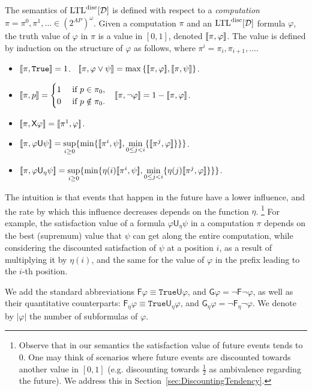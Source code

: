 \documentclass{llncs}
\newcommand{\set}[1]{{\left\{#1\right\}}}
\newcommand{\True}{\mathtt{True}}
\newcommand{\LTL}{{\ensuremath{\rm LTL}}\xspace}
\newcommand{\Next}{\mathsf{X}}
\newcommand{\Ev}{\mathsf{F}}
\newcommand{\Alw}{\mathsf{G}}
\newcommand{\Until}{\mathsf{U}}
\newcommand{\D}{{\cal D}}
\renewcommand{\phi}{\varphi}
\newcommand{\maxs}[1]{\max\set{#1}}
\newcommand{\DLTL}{\ensuremath{\LTL^{\text{disc}}[\D]}}
\newcommand{\df}{\eta}
\begin{document}
The semantics of $\DLTL$ is defined with respect to a {\em computation\/} $\pi=\pi^0,\pi^1,\ldots \in (2^{AP})^\omega$. Given a computation $\pi$ and an $\DLTL$ formula $\varphi$, the truth value of $\varphi$ in $\pi$ is a value in $[0,1]$, denoted $\sem{\pi,\phi}$. The value is defined by induction on the structure of $\varphi$ as follows, where $\pi^i=\pi_i,\pi_{i+1},\ldots$.
\begin{itemize}
\item $\sem{\pi,\True}=1$. \hspace{2.98cm}  ~$\sem{\pi, \phi\vee \psi}=\maxs{\sem{\pi, \phi},\sem{\pi,\psi}}$.
\item $[\![\pi,p]\!]=
\begin{cases}
1 & \mbox{ if }p\in \pi_0,\\
0 & \mbox{ if } p\notin \pi_0.
\end{cases}$  \hspace{1.5cm}  ~$\sem{\pi,\neg \phi}=1-\sem{\pi, \phi}$.
\item $\sem{\pi,\Next \phi}=\sem{\pi^1,\phi}$.
\item $\sem{\pi, \varphi \Until \psi}  = \sup\limits_{i\ge 0} \{ \min \{\sem{\pi^i,\psi},  \min\limits_{0\leq j < i}\{ \sem{\pi^j,\varphi}\}\}\}$.
\item $\sem{\pi, \varphi \Until_{\df} \psi}  = \sup\limits_{i\ge 0} \{ \min \{\df(i)\sem{\pi^i,\psi},  \min\limits_{0\leq j < i}\{\df(j) \sem{\pi^j,\varphi}\}\}\}$.


\end{itemize}

The intuition is that events that happen in the future have a lower influence,
 and the rate by which this influence decreases depends on the function $\df$.
\footnote{Observe that in our semantics the satisfaction value of future events tends to $0$. One may think of scenarios where future events are discounted towards another value in $[0,1]$ (e.g. discounting towards $\frac12$ as ambivalence regarding the future). We address this in Section~\ref{sec:DiscountingTendency}.} For example, the satisfaction value of a formula $\varphi \Until_{\df} \psi$ in a computation $\pi$ depends on the best (supremum) value that $\psi$ can get along the entire computation, while considering the discounted satisfaction of $\psi$ at a position $i$, as a result of multiplying it by $\df(i)$,
and the same for the value of $\varphi$ in the prefix leading to the $i$-th position.

We add the standard abbreviations $\Ev \phi\equiv \True\Until \phi$, and $\Alw \phi=\neg \Ev \neg \phi$, as well as their quantitative counterparts: $\Ev_\df \phi\equiv \True\Until_\df \phi$, and $\Alw_\df \phi=\neg \Ev_\df \neg \phi$.
We denote by $|\phi|$ the number of subformulas of $\phi$. 
\end{document}

